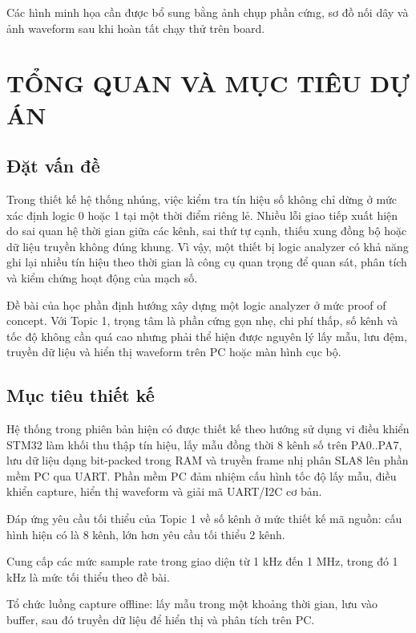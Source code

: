 Các hình minh họa cần được bổ sung bằng ảnh chụp phần cứng, sơ đồ nối dây và ảnh waveform sau khi hoàn tất chạy thử trên board.

\chapter{TỔNG QUAN VÀ MỤC TIÊU DỰ ÁN}\label{tux1ed5ng-quan-vuxe0-mux1ee5c-tiuxeau-dux1ef1-uxe1n}

\section{Đặt vấn đề}\label{ux111ux1eb7t-vux1ea5n-ux111ux1ec1}

Trong thiết kế hệ thống nhúng, việc kiểm tra tín hiệu số không chỉ dừng ở mức xác định logic 0 hoặc 1 tại một thời điểm riêng lẻ. Nhiều lỗi giao tiếp xuất hiện do sai quan hệ thời gian giữa các kênh, sai thứ tự cạnh, thiếu xung đồng bộ hoặc dữ liệu truyền không đúng khung. Vì vậy, một thiết bị logic analyzer có khả năng ghi lại nhiều tín hiệu theo thời gian là công cụ quan trọng để quan sát, phân tích và kiểm chứng hoạt động của mạch số.

Đề bài của học phần định hướng xây dựng một logic analyzer ở mức proof of concept. Với Topic 1, trọng tâm là phần cứng gọn nhẹ, chi phí thấp, số kênh và tốc độ không cần quá cao nhưng phải thể hiện được nguyên lý lấy mẫu, lưu đệm, truyền dữ liệu và hiển thị waveform trên PC hoặc màn hình cục bộ.

\section{Mục tiêu thiết kế}\label{mux1ee5c-tiuxeau-thiux1ebft-kux1ebf}

Hệ thống trong phiên bản hiện có được thiết kế theo hướng sử dụng vi điều khiển STM32 làm khối thu thập tín hiệu, lấy mẫu đồng thời 8 kênh số trên PA0..PA7, lưu dữ liệu dạng bit-packed trong RAM và truyền frame nhị phân SLA8 lên phần mềm PC qua UART. Phần mềm PC đảm nhiệm cấu hình tốc độ lấy mẫu, điều khiển capture, hiển thị waveform và giải mã UART/I2C cơ bản.

Đáp ứng yêu cầu tối thiểu của Topic 1 về số kênh ở mức thiết kế mã nguồn: cấu hình hiện có là 8 kênh, lớn hơn yêu cầu tối thiểu 2 kênh.

Cung cấp các mức sample rate trong giao diện từ 1 kHz đến 1 MHz, trong đó 1 kHz là mức tối thiểu theo đề bài.

Tổ chức luồng capture offline: lấy mẫu trong một khoảng thời gian, lưu vào buffer, sau đó truyền dữ liệu để hiển thị và phân tích trên PC.


